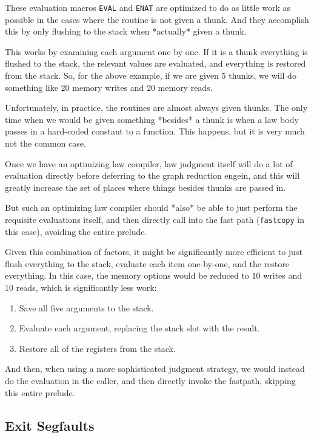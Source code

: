 These evaluation macros \lstinline|EVAL| and \lstinline|ENAT| are
optimized to do as little work as possible in the cases where the routine
is not given a thunk.  And they accomplish this by only flushing to the
stack when *actually* given a thunk.

This works by examining each argument one by one.  If it is a thunk
everything is flushed to the stack, the relevant values are evaluated,
and everything is restored from the stack.  So, for the above example,
if we are given 5 thunks, we will do something like 20 memory writes
and 20 memory reads.

Unfortunately, in practice, the routines are almost always given thunks.
The only time when we would be given something *besides* a thunk is when
a law body passes in a hard-coded constant to a function.  This happens,
but it is very much not the common case.

Once we have an optimizing law compiler, law judgment itself will do a
lot of evaluation directly before deferring to the graph reduction engein,
and this will greatly increase the set of places where things besides
thunks are passed in.

But such an optimizing law compiler should *also* be able to just perform
the requisite evaluations itself, and then directly call into the fast
path (\lstinline|fastcopy| in this case), avoiding the entire prelude.

Given this combination of factors, it might be significantly more
efficient to just flush everything to the stack, evaluate each item
one-by-one, and the restore everything.  In this case, the memory options
would be reduced to 10 writes and 10 reads, which is significantly
less work:

\begin{enumerate}
\item Save all five arguments to the stack.
\item Evaluate each argument, replacing the stack slot with the result.
\item Restore all of the registers from the stack.
\end{enumerate}

And then, when using a more sophisticated judgment strategy, we would
instead do the evaluation in the caller, and then directly invoke the
fastpath, skipping this entire prelude.

\subsection{Exit Segfaults}

